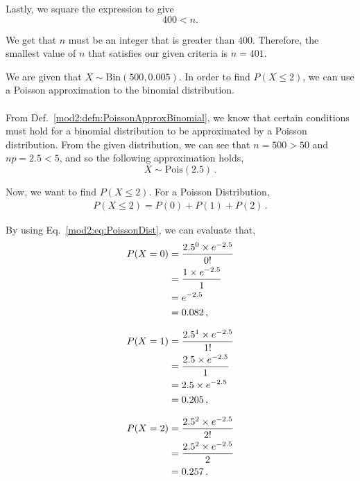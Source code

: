 \begin{subquestions}
\begin{subsubquestions}
   Lastly, we square the expression to give
   \begin{equation}
   	400<n.  
   \end{equation}

   We get that $n$ must be an integer that is greater than $400$. Therefore, the smallest value of $n$ that satisfies our given criteria is $n=401$.
\end{subsubquestions}  

\subquestion

We are given that $X \sim \text{Bin} (500,0.005)$. In order to find $P(X\leq2)$, we can use a Poisson approximation to the binomial distribution. \\ \\
From Def.~\ref{mod2:defn:PoissonApproxBinomial}, we know that certain conditions must hold for a binomial distribution to be approximated by a Poisson distribution.
From the given distribution, we can see that $n=500>50$ and $np=2.5<5$, and so the following approximation holds,
\begin{equation}
   X \sim \text{Pois} (2.5) \,.
\end{equation}

Now, we want to find $P(X\leq2)$. For a Poisson Distribution, 
\begin{align}
	P(X \leq 2) = P(0) + P(1) + P(2) \,.
\end{align}

By using Eq.~\ref{mod2:eq:PoissonDist}, we can evaluate that, 
\begin{align}
	P(X = 0) & =\frac{ 2.5 ^ 0 \times e^{-2.5}}{0!} \nonumber \\
  & =\frac{1 \times e^{-2.5}}{1} \nonumber \\
  & =e^{-2.5} \nonumber \\
  & = 0.082 \,,
\end{align}

\begin{align}
	P(X = 1) & =\frac{ 2.5 ^ 1 \times e^{-2.5}}{1!} \nonumber \\
	& =\frac{2.5 \times e^{-2.5}}{1} \nonumber \\
	& =2.5 \times e^{-2.5} \nonumber \\
	& = 0.205 \,,
\end{align}

\begin{align}
	P(X = 2) & =\frac{ 2.5 ^ 2 \times e^{-2.5}}{2!} \nonumber \\
	& =\frac{2.5^2 \times e^{-2.5}}{2} \nonumber \\
	& = 0.257\,.
\end{align}
	

\end{subquestions}
